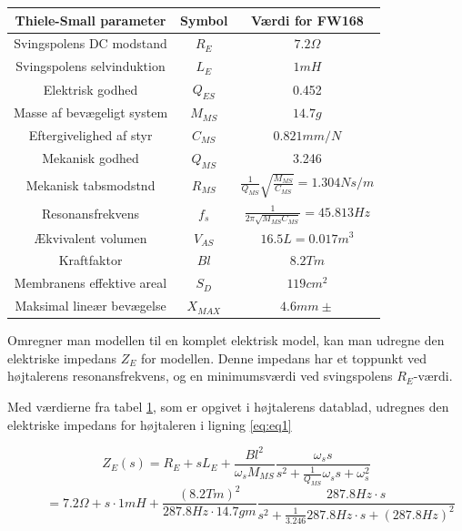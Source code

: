 \begin{table}
\centering
\begin{tabular}[C]{|c|c|c|}

	
\hline	
 \textbf{Thiele-Small parameter} & \textbf{Symbol} & \textbf{Værdi for FW168} \\\hline
 Svingspolens DC modstand & $R_E$ & $7.2\Omega$ \\\hline
 Svingspolens selvinduktion & $L_E$ & $1mH$  \\\hline
 Elektrisk godhed & $Q_{ES}$ & 0.452 \\\hline
 Masse af bevægeligt system & $M_{MS}$ & $14.7g$  \\\hline
 Eftergivelighed af styr & $C_{MS}$ & $0.821mm/N$  \\\hline
 Mekanisk godhed & $Q_{MS}$ & 3.246  \\\hline
 Mekanisk tabsmodstnd & $R_{MS}$ & \( \frac{1}{Q_{MS}}\sqrt{\frac{M_{MS}}{C_{MS}}}=1.304Ns/m \)  \\\hline
 Resonansfrekvens & $f_s$ & \( \frac{1}{2\pi\sqrt{M_{MS} C_{MS}}}=45.813Hz \) \\\hline
 
 
 Ækvivalent volumen & $ V_{AS} $ & $16.5L=0.017m^3$ \\\hline
 Kraftfaktor & $Bl$ & $8.2Tm$ \\\hline
 Membranens effektive areal & $S_D$ & $119cm^2$ \\\hline
 Maksimal lineær bevægelse & $X_{MAX}$ & $4.6mm\pm$ \\\hline
 
\end{tabular}
\label{tab:TS}
\end{table}

Omregner man modellen til en komplet elektrisk model, kan man udregne den elektriske impedans $Z_E$ for modellen. Denne impedans har et toppunkt ved højtalerens resonansfrekvens, og en minimumsværdi ved svingspolens $R_E$-værdi. 

Med værdierne fra tabel \ref{tab:TS}, som er opgivet i højtalerens datablad\cite{FW168}, udregnes den elektriske impedans for højtaleren i ligning \ref{eq:eq1}

\begin{equation}\label{eq:eq1}
Z_E(s)=R_E+sL_E+\frac{Bl^2}{\omega_s M_{MS}} \frac{ \omega_s s}{ s^2 + \frac{1}{Q_{MS}} \omega_s s + \omega_s^2} \end{equation} \begin{equation} \ \qquad  = 
7.2\Omega + s \cdot 1mH + \frac{(8.2 Tm)^2}{287.8Hz \cdot 14.7gm} \frac{ 287.8Hz \cdot s}{ s^2 + \frac{1}{3.246} 287.8Hz \cdot s + (287.8Hz)^2}  \end{equation}

